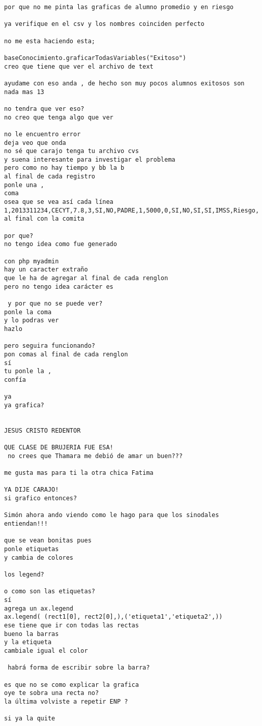 \begin{verbatim}
por que no me pinta las graficas de alumno promedio y en riesgo

ya verifique en el csv y los nombres coinciden perfecto

no me esta haciendo esta;

baseConocimiento.graficarTodasVariables("Exitoso")
creo que tiene que ver el archivo de text

ayudame con eso anda , de hecho son muy pocos alumnos exitosos son nada mas 13

no tendra que ver eso?
no creo que tenga algo que ver

no le encuentro error
deja veo que onda
no sé que carajo tenga tu archivo cvs
y suena interesante para investigar el problema
pero como no hay tiempo y bb la b
al final de cada registro
ponle una ,
coma
osea que se vea así cada línea
1,2013311234,CECYT,7.8,3,SI,NO,PADRE,1,5000,0,SI,NO,SI,SI,IMSS,Riesgo,
al final con la comita

por que?
no tengo idea como fue generado

con php myadmin
hay un caracter extraño
que le ha de agregar al final de cada renglon
pero no tengo idea carácter es

 y por que no se puede ver?
ponle la coma
y lo podras ver
hazlo

pero seguira funcionando?
pon comas al final de cada renglon
sí
tu ponle la ,
confía

ya
ya grafica?


JESUS CRISTO REDENTOR

QUE CLASE DE BRUJERIA FUE ESA!
 no crees que Thamara me debió de amar un buen???

me gusta mas para ti la otra chica Fatima

YA DIJE CARAJO!
si grafico entonces?

Simón ahora ando viendo como le hago para que los sinodales entiendan!!! 

que se vean bonitas pues
ponle etiquetas
y cambia de colores

los legend?

o como son las etiquetas?
sí
agrega un ax.legend
ax.legend( (rect1[0], rect2[0],),('etiqueta1','etiqueta2',))
ese tiene que ir con todas las rectas
bueno la barras
y la etiqueta
cambiale igual el color

 habrá forma de escribir sobre la barra?

es que no se como explicar la grafica
oye te sobra una recta no?
la última volviste a repetir ENP ?

si ya la quite


\end{verbatim}
